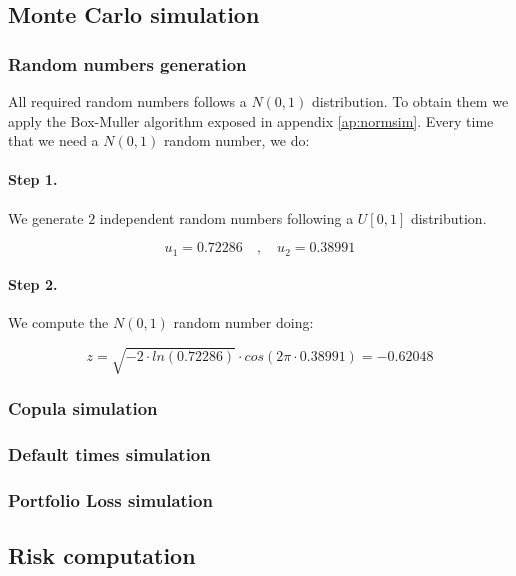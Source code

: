 \documentclass[a4paper,12pt,final]{article}
\begin{document}
\subsection{Monte Carlo simulation}

\subsubsection{Random numbers generation}
All required random numbers follows a $N(0,1)$ distribution. To obtain them
we apply the Box-Muller algorithm exposed in appendix \ref{ap:normsim}. Every 
time that we need a $N(0,1)$ random number, we do:

\paragraph{Step 1.} We generate $2$ independent random numbers following 
a $U[0,1]$ distribution.

\begin{displaymath}
u_1 = 0.72286 \quad , \quad u_2 = 0.38991
\end{displaymath}

\paragraph{Step 2.} We compute the $N(0,1)$ random number doing:

\begin{displaymath}
z = 
\sqrt{-2 \cdot ln(0.72286)} \cdot cos(2 \pi \cdot 0.38991) =
-0.62048
\end{displaymath}


\subsubsection{Copula simulation}

\subsubsection{Default times simulation}

\subsubsection{Portfolio Loss simulation}


\subsection{Risk computation}
\end{document}

